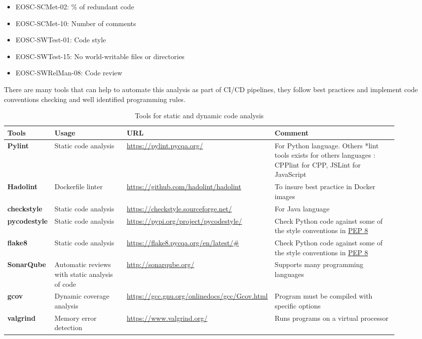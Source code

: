 \begin{itemize}
  \item EOSC-SCMet-02: \% of redundant code
  \item EOSC-SCMet-10: Number of comments
  \item EOSC-SWTest-01: Code style
  \item EOSC-SWTest-15: No world-writable files or directories
  \item EOSC-SWRelMan-08: Code review
\end{itemize}

There are many tools that can help to automate this analysis as part of CI/CD pipelines, they follow best practices and implement code conventions checking and well identified programming rules.

\begin{center}
\begin{table}

  \small
  \begin{tabular}{|p{0.12\linewidth}|p{0.2\linewidth}|p{0.25\linewidth}|p{0.35\linewidth}|} \hline

    \textbf{Tools} & \textbf{Usage} & \textbf{URL} & \textbf{Comment} \\ \hline \hline
    \textbf{Pylint} & Static code analysis & \url{https://pylint.pycqa.org/} & For Python language. Others *lint tools exists for others languages : CPPlint for CPP, JSLint for JavaScript \\ \hline
    \textbf{Hadolint} & Dockerfile linter & \url{https://github.com/hadolint/hadolint} & To insure best practice in Docker images \\ \hline
    \textbf{checkstyle} & Static code analysis & \url{https://checkstyle.sourceforge.net/} & For Java language  \\ \hline
    \textbf{pycodestyle} & Static code analysis & \url{https://pypi.org/project/pycodestyle/} & Check Python code against some of the style conventions in \href{http://www.python.org/dev/peps/pep-0008/}{PEP 8}  \\ \hline
    \textbf{flake8} & Static code analysis & \url{https://flake8.pycqa.org/en/latest/#} & Check Python code against some of the style conventions in \href{http://www.python.org/dev/peps/pep-0008/}{PEP 8} \\ \hline
    \textbf{SonarQube} & Automatic reviews with static analysis of code & \url{http://sonarqube.org/} & Supports many programming languages  \\ \hline
    \textbf{gcov} & Dynamic coverage analysis & \url{https://gcc.gnu.org/onlinedocs/gcc/Gcov.html} & Program must be compiled with specific options  \\ \hline
    \textbf{valgrind} & Memory error detection & \url{https://www.valgrind.org/} & Runs programs on a virtual processor  \\ \hline

  \end{tabular}
  \caption{Tools for static and dynamic code analysis}
  \label{tab:tools_pack03}
\end{table}
\end{center}

